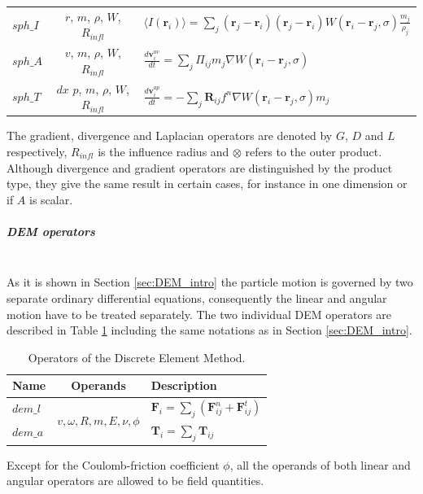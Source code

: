 \documentclass[a4paper,12pt,openany]{book}
\newcommand{\mysubparagraph}[1]{\subparagraph{#1}\mbox{}\\}
\theoremstyle{break}
\begin{document}
\begin{table} [h!]
\begin{center}
\begin{tabular}{ l c l }
$sph\_I$ & $r$, $m$, $\rho$, $W$, $R_{infl}$ & $\langle I(\textbf{r}_i)\rangle=\sum_{j}{(\textbf{r}_j-\textbf{r}_i)(\textbf{r}_j-\textbf{r}_i)W(\textbf{r}_i-\textbf{r}_j,\sigma)\frac{m_j}{\rho_j}}$ \\ [2ex]
$sph\_A$ & $v$, $m$, $\rho$, $W$, $R_{infl}$ &$\frac{d\textbf{v}^{av}_i}{dt}=\sum_{j}{\Pi_{ij}m_j\nabla W(\textbf{r}_i-\textbf{r}_j,\sigma)}$ \\ [2ex]
$sph\_T$ & $dx$ $p$, $m$, $\rho$, $W$, $R_{infl}$ &$\frac{d\textbf{v}^{ap}_i}{dt}=-\sum_{j}{\textbf{R}_{ij}f^n\nabla W(\textbf{r}_i-\textbf{r}_j,\sigma)m_j}$ \\ [2ex]
\bottomrule[1.25pt]
\end{tabular}
\end{center}
\end{table}
The gradient, divergence and Laplacian operators are denoted by $G$, $D$ and $L$ respectively, $R_{infl}$ is the influence radius and $\otimes$ refers to the outer product. Although divergence and gradient operators are distinguished by the product type, they give the same result in certain cases, for instance in one dimension or if $A$ is scalar.

\mysubparagraph{DEM operators}
As it is shown in Section \ref{sec:DEM_intro} the particle motion is governed by two separate ordinary differential equations, consequently the linear and angular motion have to be treated separately. The two individual DEM operators are described in Table \ref{tbl:DEM_ops} including the same notations as in Section \ref{sec:DEM_intro}.
\begin{table} [h!]
\begin{center}
\caption{Operators of the Discrete Element Method.} \label{tbl:DEM_ops}
\begin{tabular}{ l c l }
\toprule[1.5pt]
\bf Name & \bf Operands & \bf Description \\ 
\midrule
$dem\_l$ & \multirow{2}{*}{$v, \omega, R, m, E, \nu, \phi$} & $\textbf{F}_i=\sum_{j}{\left(\textbf{F}^n_{ij}+\textbf{F}^t_{ij}\right)}$ \\ 
$dem\_a$ &  & $\textbf{T}_i=\sum_{j}{\textbf{T}_{ij}}$ \\ 
\bottomrule[1.25pt]
\end{tabular}
\end{center}
\end{table}
Except for the Coulomb-friction coefficient $\phi$, all the operands of both linear and angular operators are allowed to be field quantities.
\end{document}
